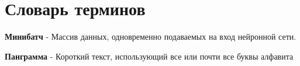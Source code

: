 \chapter*{Словарь терминов}             %

\textbf{Минибатч} - Массив данных, одновременно подаваемых на вход нейронной сети. 

\textbf{Панграмма} - Короткий текст, использующий все или почти все буквы алфавита
